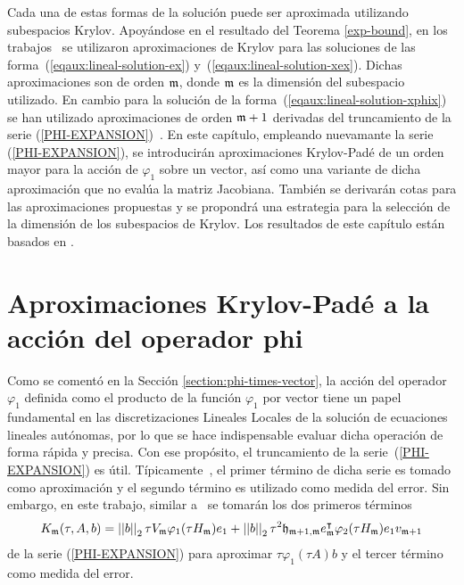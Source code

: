 Cada una de estas formas de la solución puede ser aproximada utilizando subespacios Krylov. Apoyándose en el resultado del Teorema \ref{exp-bound}, en los trabajos~\cite{hochbruck1998exponential,jimenez2012convergence} se utilizaron aproximaciones de Krylov para las soluciones de las forma~(\ref{eqaux:lineal-solution-ex}) y~(\ref{eqaux:lineal-solution-xex}). Dichas aproximaciones son de orden $\mathfrak{m}$, donde $\mathfrak{m}$ es la dimensión del subespacio utilizado. En cambio para la solución de la forma~(\ref{eqaux:lineal-solution-xphix}) se han utilizado aproximaciones de orden  $\mathfrak{m}+1$ derivadas del truncamiento de la serie (\ref{PHI-EXPANSION})~\cite{sidje1998expokit,niesen2012algorithm}. En este capítulo, empleando nuevamante la serie (\ref{PHI-EXPANSION}), se introducirán aproximaciones Krylov-Padé de un orden mayor para la acción de $\varphi_1$ sobre un vector, así como una variante de dicha aproximación que no evalúa la matriz Jacobiana. También se derivarán cotas para las aproximaciones propuestas y se propondrá una estrategia para la selección de la dimensión de los subespacios de Krylov. Los resultados de este capítulo están basados en \cite{naranjo2023computing,naranjo2023RT,naranjo2021locally,naranjo2023jacobian}.

\section{Aproximaciones Krylov-Padé a la acción del operador phi}\label{section:krylov-pade-approx}

Como se comentó en la Sección \ref{section:phi-times-vector}, la acción del operador $\varphi_1$ definida como el producto de la función $\varphi_1$ por vector tiene un papel fundamental en las discretizaciones Lineales Locales de la solución de ecuaciones lineales autónomas, por lo que se hace indispensable evaluar dicha operación de forma rápida y precisa. Con ese propósito, el truncamiento de la serie~(\ref{PHI-EXPANSION}) es útil. Típicamente~\cite{niesen2012algorithm,sidje1998expokit,tokman2006efficient}, el primer término de dicha serie es tomado como aproximación y el segundo término es utilizado como medida del error. Sin embargo, en este trabajo, similar a~\cite{Saad92} se tomarán los dos primeros términos
 \begin{equation}\label{exact-two-terms-km}
    K_{\mathfrak{m}}(\tau,A,b) = \left\lvert \left\lvert  b  \right\rvert \right\rvert_2\tau V_{\mathfrak{m}}\varphi_1(\tau H_{\mathfrak{m}})e_1 + \left\lvert \left\lvert  b  \right\rvert \right\rvert_2\tau^2\mathfrak{h}_{\mathfrak{m}+1,\mathfrak{m}}e^\intercal_{\mathfrak{m}}\varphi_2(\tau H_{\mathfrak{m}})e_1v_{\mathfrak{m}+1}
 \end{equation}
de la serie (\ref{PHI-EXPANSION}) para aproximar $\tau\varphi_1(\tau A)b$ y el tercer término como medida del error.


